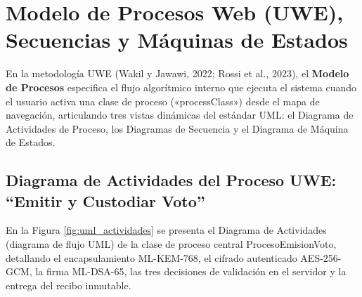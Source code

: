 \section{Modelo de Procesos Web (UWE), Secuencias y Máquinas de Estados}
\label{sec:modelo_procesos_uwe}
\label{sec:diagramas_secuencia}
\label{sec:diagramas_estados}

En la metodología UWE (Wakil y Jawawi, 2022; Rossi et al., 2023), el \textbf{Modelo de Procesos} especifica el flujo algorítmico interno que ejecuta el sistema cuando el usuario activa una clase de proceso («processClass») desde el mapa de navegación, articulando tres vistas dinámicas del estándar UML: el Diagrama de Actividades de Proceso, los Diagramas de Secuencia y el Diagrama de Máquina de Estados.

\subsection{Diagrama de Actividades del Proceso UWE: ``Emitir y Custodiar Voto''}
\label{subsec:actividades_proceso_uwe}

En la Figura \ref{fig:uml_actividades} se presenta el Diagrama de Actividades (diagrama de flujo UML) de la clase de proceso central ProcesoEmisionVoto, detallando el encapsulamiento ML-KEM-768, el cifrado autenticado AES-256-GCM, la firma ML-DSA-65, las tres decisiones de validación en el servidor y la entrega del recibo inmutable.

